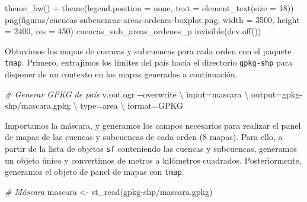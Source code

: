 \documentclass[spanish]{article}
\newenvironment{Shaded}{\begin{snugshade}}{\end{snugshade}}
\newcommand{\AttributeTok}[1]{\textcolor[rgb]{0.77,0.63,0.00}{#1}}
\newcommand{\CommentTok}[1]{\textcolor[rgb]{0.56,0.35,0.01}{\textit{#1}}}
\newcommand{\DataTypeTok}[1]{\textcolor[rgb]{0.13,0.29,0.53}{#1}}
\newcommand{\DecValTok}[1]{\textcolor[rgb]{0.00,0.00,0.81}{#1}}
\newcommand{\ExtensionTok}[1]{#1}
\newcommand{\FunctionTok}[1]{\textcolor[rgb]{0.00,0.00,0.00}{#1}}
\newcommand{\NormalTok}[1]{#1}
\newcommand{\OtherTok}[1]{\textcolor[rgb]{0.56,0.35,0.01}{#1}}
\newcommand{\SpecialCharTok}[1]{\textcolor[rgb]{0.00,0.00,0.00}{#1}}
\newcommand{\StringTok}[1]{\textcolor[rgb]{0.31,0.60,0.02}{#1}}
\begin{document}
\begin{Shaded}
\begin{Highlighting}[]
  \FunctionTok{theme\_bw}\NormalTok{() }\SpecialCharTok{+}
  \FunctionTok{theme}\NormalTok{(}\AttributeTok{legend.position =} \StringTok{\textquotesingle{}none\textquotesingle{}}\NormalTok{, }\AttributeTok{text =} \FunctionTok{element\_text}\NormalTok{(}\AttributeTok{size =} \DecValTok{18}\NormalTok{))}
\FunctionTok{png}\NormalTok{(}\StringTok{\textquotesingle{}figuras/cuencas{-}subcuencas{-}areas{-}ordenes{-}boxplot.png\textquotesingle{}}\NormalTok{,}
    \AttributeTok{width =} \DecValTok{3500}\NormalTok{, }\AttributeTok{height =} \DecValTok{2400}\NormalTok{, }\AttributeTok{res =} \DecValTok{450}\NormalTok{)}
\NormalTok{cuencas\_sub\_areas\_ordenes\_p}
\FunctionTok{invisible}\NormalTok{(}\FunctionTok{dev.off}\NormalTok{())}
\end{Highlighting}
\end{Shaded}

Obtuvimos los mapas de cuencas y subcuencas para cada orden con el
paquete \texttt{tmap}. Primero, extrajimos los límites del país hacia el
directorio \texttt{gpkg-shp} para disponer de un contexto en los mapas
generados a continuación.

\begin{Shaded}
\begin{Highlighting}[]
\CommentTok{\# Generar GPKG de país}
\ExtensionTok{v.out.ogr} \AttributeTok{{-}{-}overwrite} \DataTypeTok{\textbackslash{}}
\NormalTok{  input=mascara }\DataTypeTok{\textbackslash{}}
\NormalTok{  output=gpkg{-}shp/mascara.gpkg }\DataTypeTok{\textbackslash{}}
\NormalTok{  type=area }\DataTypeTok{\textbackslash{}}
\NormalTok{  format=GPKG}
\end{Highlighting}
\end{Shaded}

Importamos la máscara, y generamos los campos necesarios para realizar
el panel de mapas de las cuencas y subcuencas de cada orden (8 mapas).
Para ello, a partir de la lista de objetos \texttt{sf} conteniendo las
cuencas y subcuencas, generamos un objeto único y convertimos de metros
a kilómetros cuadrados. Posteriormente, generamos el objeto de panel de
mapas con \texttt{tmap}.

\begin{Shaded}
\begin{Highlighting}[]
\CommentTok{\# Máscara}
\NormalTok{mascara }\OtherTok{\textless{}{-}} \FunctionTok{st\_read}\NormalTok{(}\StringTok{\textquotesingle{}gpkg{-}shp/mascara.gpkg\textquotesingle{}}\NormalTok{)}
\end{Highlighting}
\end{Shaded}
\end{document}
